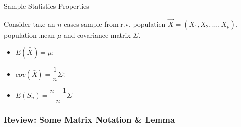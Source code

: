 \begin{point}
    \hypertarget{SampleStatisticsProperties}{Sample Statistics Properties}
\end{point}

    Consider take an $ n $ cases sample from r.v. population $ \vec{X}=(X_1,X_2,\ldots,X_p) $, population mean $ \mu $ and covariance matrix $ \Sigma  $.
    \begin{itemize}[topsep=6pt,itemsep=4pt]
        \item $ E(\bar{\bar{X}})=\mu $;
        \item $ cov(\bar{X})=\dfrac{1}{n}\Sigma  $;
        \item $ E(S_n)=\dfrac{n-1}{n}\Sigma  $
    \end{itemize}
    
        


\subsubsection{Review: Some Matrix Notation \& Lemma}\label{SubSubSectionMatrixNotationAndLemma}

